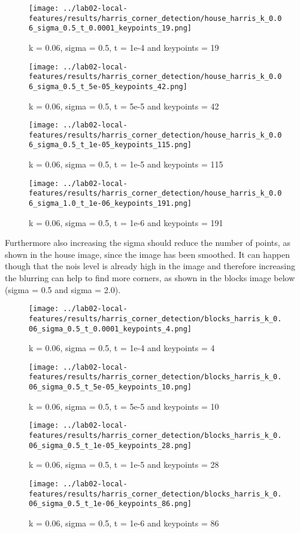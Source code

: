 \documentclass{ETHExercise}
\begin{document}
\begin{figure}[!h]
      \texttt{[image: ../lab02-local-features/results/harris\_corner\_detection/house\_harris\_k\_0.06\_sigma\_0.5\_t\_0.0001\_keypoints\_19.png]}
      \caption{k = 0.06, sigma = 0.5, t = 1e-4 and keypoints = 19}
    \endminipage\hfill
      \texttt{[image: ../lab02-local-features/results/harris\_corner\_detection/house\_harris\_k\_0.06\_sigma\_0.5\_t\_5e-05\_keypoints\_42.png]}
      \caption{k = 0.06, sigma = 0.5, t = 5e-5 and keypoints = 42}
    \endminipage\hfill
      \texttt{[image: ../lab02-local-features/results/harris\_corner\_detection/house\_harris\_k\_0.06\_sigma\_0.5\_t\_1e-05\_keypoints\_115.png]}
      \caption{k = 0.06, sigma = 0.5, t = 1e-5 and keypoints = 115}
    \endminipage\hfill
      \texttt{[image: ../lab02-local-features/results/harris\_corner\_detection/house\_harris\_k\_0.06\_sigma\_1.0\_t\_1e-06\_keypoints\_191.png]}
      \caption{k = 0.06, sigma = 0.5, t = 1e-6 and keypoints = 191}
    \endminipage
\end{figure}
\newpage
Furthermore also increasing the sigma should reduce the number of points, as shown in the house image,
since the image has been smoothed. It can happen though that the nois level is already high in the image and therefore increasing the
blurring can help to find more corners, as shown in the blocks image below (sigma = 0.5 and sigma = 2.0). 
\begin{figure}[!h]
    \texttt{[image: ../lab02-local-features/results/harris\_corner\_detection/blocks\_harris\_k\_0.06\_sigma\_0.5\_t\_0.0001\_keypoints\_4.png]}
    \caption{k = 0.06, sigma = 0.5, t = 1e-4 and keypoints = 4}
  \endminipage\hfill
    \texttt{[image: ../lab02-local-features/results/harris\_corner\_detection/blocks\_harris\_k\_0.06\_sigma\_0.5\_t\_5e-05\_keypoints\_10.png]}
    \caption{k = 0.06, sigma = 0.5, t = 5e-5 and keypoints = 10}
  \endminipage\hfill
    \texttt{[image: ../lab02-local-features/results/harris\_corner\_detection/blocks\_harris\_k\_0.06\_sigma\_0.5\_t\_1e-05\_keypoints\_28.png]}
    \caption{k = 0.06, sigma = 0.5, t = 1e-5 and keypoints = 28}
  \endminipage\hfill
    \texttt{[image: ../lab02-local-features/results/harris\_corner\_detection/blocks\_harris\_k\_0.06\_sigma\_0.5\_t\_1e-06\_keypoints\_86.png]}
    \caption{k = 0.06, sigma = 0.5, t = 1e-6 and keypoints = 86}
  \endminipage
\end{figure}
\end{document}
